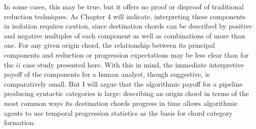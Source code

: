 In some cases, this may be true, but it offers no proof or disproof of traditional reduction techniques.  As Chapter 4 will indicate, interpreting these components in isolation requires caution, since destination chords can be described by positive and negative multiples of each component as well as combinations of more than one.  For any given origin chord, the relationship between its principal components and reduction or progression expectations may be less clear than for the $ii$ case study presented here.  With this in mind, the immediate interpretive payoff of the components for a human analyst, though suggestive, is comparatively small.  But I will argue that the algorithmic payoff for a pipeline producing syntactic categories is large: describing an origin chord in terms of the most common ways its destination chords progress in time allows algorithmic agents to use temporal progression statistics as the basis for chord category formation.
